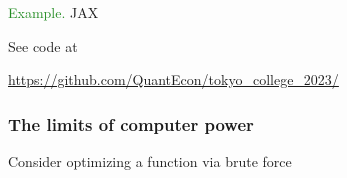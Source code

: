 \documentclass[
    xcolor={svgnames,dvipsnames},
    hyperref={colorlinks, citecolor=DeepPink4, linkcolor=DarkRed, urlcolor=DarkBlue}
    ]{beamer}  %
\newcommand{\Eg}{\textcolor{ForestGreen}{Example. }}
\newcommand{\1}{\mathbbm 1}
\begin{document}






\begin{frame}

    \Eg JAX 

    \vspace{0.5em}
    \vspace{0.5em}
    \vspace{0.5em}
    \vspace{0.5em}
    \vspace{0.5em}
    See code at
    \begin{center}
        \url{https://github.com/QuantEcon/tokyo_college_2023/}
    \end{center}

\end{frame}




\begin{frame}
    \frametitle{The limits of computer power}


    Consider optimizing a function via brute force
        
\end{frame}
\end{document}
